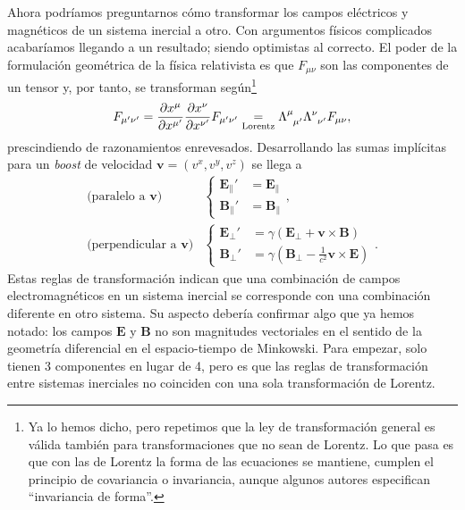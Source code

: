 Ahora podríamos preguntarnos cómo transformar los campos eléctricos y magnéticos de un sistema inercial a otro. Con argumentos físicos complicados acabaríamos llegando a un resultado; siendo optimistas al correcto. El poder de la formulación geométrica de la física relativista es que \(F_{\mu\nu}\) son las componentes de un tensor y, por tanto, se transforman según\footnote{Ya lo hemos dicho, pero repetimos que la ley de transformación general es válida también para
transformaciones que no sean de Lorentz. Lo que pasa es que con las de Lorentz la forma de las ecuaciones se mantiene, cumplen el principio de covariancia o invariancia, aunque algunos autores especifican ``invariancia de forma''.}
\begin{equation*}
    F_{\mu'\nu'} = \jcbn{x}{\mu}{x}{\mu'}\jcbn{x}{\nu}{x}{\nu'} F_{\mu'\nu'} \underset{\text{Lorentz}}{=} \tensor{\Lambda}{^\mu_{\mu'}}\tensor{\Lambda}{^\nu_{\nu'}} F_{\mu\nu},
\end{equation*}
prescindiendo de razonamientos enrevesados. Desarrollando las sumas implícitas para un \textit{boost} de velocidad \(\mathbf{v} = (v^x, v^y, v^z)\) se llega a
\begin{subequations}
    \label{eq.1-EB_lorentz}
    \begin{align}
        \text{(paralelo a \(\mathbf{v}\))}&\left\{
        \begin{aligned}
            \mathbf{E}_\parallel ' &= \mathbf{E}_\parallel  \\
            \mathbf{B}_\parallel ' &= \mathbf{B}_\parallel
        \end{aligned}\right.,\\
        \text{(perpendicular a \(\mathbf{v}\))}&\left\{
        \begin{aligned}
            \mathbf{E}_\perp ' &= \gamma\left(\mathbf{E}_\perp + \mathbf{v}\times\mathbf{B}\right)  \\
            \mathbf{B}_\perp ' &= \gamma\left(\mathbf{B}_\perp - \frac{1}{c^2}\mathbf{v}\times\mathbf{E}\right)
        \end{aligned}\right..
    \end{align}
\end{subequations}
Estas reglas de transformación indican que una combinación de campos electromagnéticos en un sistema inercial se corresponde con una combinación diferente en otro sistema. Su aspecto debería confirmar algo que ya hemos notado: los campos \(\mathbf{E}\) y \(\mathbf{B}\) no son magnitudes vectoriales en el sentido de la geometría diferencial en el espacio-tiempo de Minkowski. Para empezar, solo tienen 3 componentes en lugar de 4, pero es que las reglas de transformación entre sistemas inerciales no coinciden con una sola transformación de Lorentz. 

